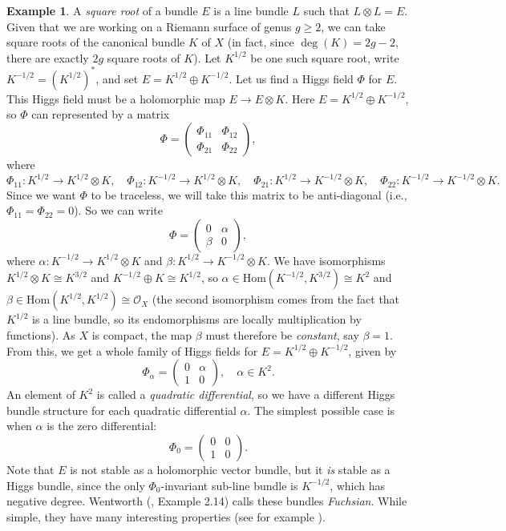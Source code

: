 \documentclass[10pt]{amsart}
\numberwithin{equation}{section}
\def\~#1{\mathscr{#1}}
\newcommand{\Hom}{\mathrm{Hom}}
\theoremstyle{plain}
\theoremstyle{definition}
\newtheorem{ex}[thm]{Example}
\theoremstyle{remark}
\begin{document}
\begin{ex}
    A \emph{square root} of a bundle $E$ is a line bundle $L$ such that $L \otimes L = E$. Given that we are working on a Riemann surface of genus $g \ge 2$, we can take square roots of the canonical bundle $K$ of $X$ (in fact, since $\deg(K) = 2g - 2$, there are exactly $2g$ square roots of $K$). Let $K^{1/2}$ be one such square root, write $K^{-1/2} = (K^{1/2})^*$, and set $E = K^{1/2} \oplus K^{-1/2}$. Let us find a Higgs field $\Phi$ for $E$. This Higgs field must be a holomorphic map $E \to E \otimes K$. Here $E = K^{1/2} \oplus K^{-1/2}$, so $\Phi$ can represented by a matrix
    \[\Phi = \begin{pmatrix} \Phi_{11} & \Phi_{12} \\ \Phi_{21} & \Phi_{22} \end{pmatrix},\] 
    where
    \[\Phi_{11}: K^{1/2} \to K^{1/2} \otimes K, \quad \Phi_{12}: K^{-1/2} \to K^{1/2} \otimes K, \quad \Phi_{21}: K^{1/2} \to K^{-1/2} \otimes K, \quad \Phi_{22}: K^{-1/2} \to K^{-1/2} \otimes K.\]
    Since we want $\Phi$ to be traceless, we will take this matrix to be anti-diagonal (i.e., $\Phi_{11} = \Phi_{22} = 0$). So we can write
    \[\Phi = \begin{pmatrix} 0 & \alpha \\ \beta & 0 \end{pmatrix},\] 
    where $\alpha: K^{-1/2} \to K^{1/2} \otimes K$ and $\beta: K^{1/2} \to K^{-1/2} \otimes K$. We have isomorphisms $K^{1/2} \otimes K \cong K^{3/2}$ and $K^{-1/2} \oplus K \cong K^{1/2}$, so $\alpha \in \Hom(K^{-1/2}, K^{3/2}) \cong K^2$ and $\beta \in \Hom(K^{1/2}, K^{1/2}) \cong \~O_X$ (the second isomorphism comes from the fact that $K^{1/2}$ is a line bundle, so its endomorphisms are locally multiplication by functions). As $X$ is compact, the map $\beta$ must therefore be \emph{constant}, say $\beta = 1$. From this, we get a whole family of Higgs fields for $E = K^{1/2} \oplus K^{-1/2}$, given by
    \[\Phi_\alpha = \begin{pmatrix} 0 & \alpha \\ 1 & 0 \end{pmatrix}, \quad \alpha \in K^2.\]
    An element of $K^2$ is called a \emph{quadratic differential}, so we have a different Higgs bundle structure for each quadratic differential $\alpha$. The simplest possible case is when $\alpha$ is the zero differential: 
    \[\Phi_0 = \begin{pmatrix} 0 & 0 \\ 1 & 0 \end{pmatrix}.\]  
    Note that $E$ is not stable as a holomorphic vector bundle, but it \emph{is} stable as a Higgs bundle, since the only $\Phi_0$-invariant sub-line bundle is $K^{-1/2}$, which has negative degree. Wentworth (\cite{wentworth2015}, Example 2.14) calls these bundles \emph{Fuchsian}. While simple, they have many interesting properties (see for example \cite{hitchin92, hitchin1987A, hitchin1987B}).
\end{ex}
\end{document}
